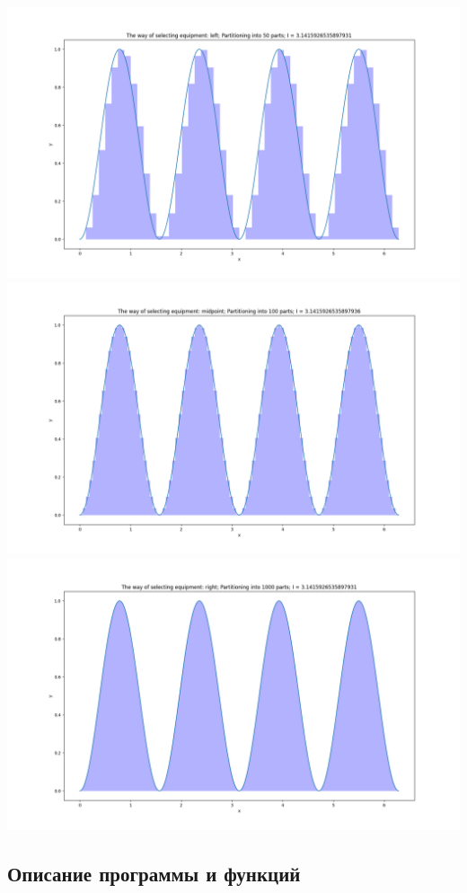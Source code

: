 \documentclass{article}
\begin{document}
\begin{center}
\includegraphics[scale = 0.5]{50_left.png}
\includegraphics[scale = 0.5]{100_midpoint.png}
\includegraphics[scale = 0.5]{1000_right.png}
\end{center}
\subsection*{Описание программы и функций}
\end{document}
